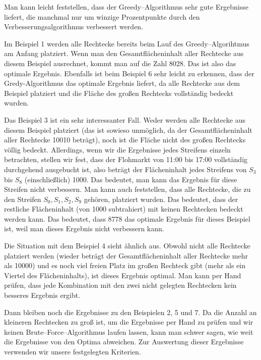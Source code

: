 


Man kann leicht feststellen, dass der Greedy--Algorithmus sehr gute Ergebnisse liefert, die 
manchmal nur um winzige Prozentpunkte durch den Verbesserungsalgorithmus verbessert werden.

Im Beispiel 1 werden alle Rechtecke bereits beim Lauf des Greedy--Algorihtmus am Anfang platziert.
Wenn man den Gesamtflächeninhalt aller Rechtecke aus diesem
Beispiel ausrechnet, kommt man auf die Zahl 8028.
Das ist also das optimale Ergebnis.
Ebenfalls ist beim Beispiel 6 sehr leicht zu erkennen, dass 
der Gredy-Algorithmus das optimale Ergebnis liefert, da alle 
Rechtecke aus dem Beispiel platziert und die Fläche des großen Rechtecks vollständig bedeckt wurden.

Das Beispiel 3 ist ein sehr interessanter Fall. 
Weder werden alle Rechtecke aus diesem Beispiel platziert (das ist sowieso unmöglich, da der Gesamtflächeninhalt aller Rechtecke 10010 beträgt), noch ist 
die Fläche nicht des großen Rechtecks völlig bedeckt. 
Allerdings, wenn wir die Ergebnisse jedes Streifens einzeln betrachten, stellen wir fest,
dass der Flohmarkt von 11:00 bis 17:00 vollständig durchgehend ausgebucht ist, also beträgt
der Flächeninhalt jedes Streifens von $S_3$ bis $S_8$ (einschließlich) 1000.
Das bedeutet, man kann das Ergebnis für diese Streifen nicht verbessern. 
Man kann auch feststellen, dass alle Rechtecke, die zu den Streifen $S_0, S_1, S_2, S_9$ gehören,
platziert wurden.
Das bedeutet, dass der restliche Flächeninhalt (von 1000 subtrahiert) 
mit keinen Rechtecken bedeckt werden kann. Das bedeutet, dass 8778 das optimale Ergebnis für dieses
Beispiel ist, weil man dieses Ergebnis nicht verbessern kann.

Die Situation mit dem Beispiel 4 sieht ähnlich aus. 
Obwohl nicht alle Rechtecke platziert werden (wieder beträgt der Gesamtflächeninhalt aller
Rechtecke mehr als 10000) und es noch viel freien Platz im großen Rechteck gibt (mehr als ein Viertel des
Flächeninhalts), ist dieses Ergebnis optimal.
Man kann per Hand prüfen, dass jede Kombination mit den zwei nicht gelegten
Rechtecken kein besseres Ergebnis ergibt.

Dann bleiben noch die Ergebnisse zu den Beispielen 2, 5 und 7. 
Da die Anzahl an kleineren Rechtecken zu groß ist, um die Ergebnisse per Hand zu prüfen und
wir keinen Brute--Force--Algorithmus laufen lassen, kann man schwer sagen,
wie weit die Ergebnisse von den Optima abweichen. 
Zur Auswertung dieser Ergebnisse verwenden wir unsere festgelegten Kriterien.

